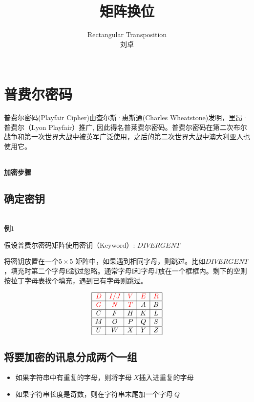 \documentclass{article}
\date{}
\title{矩阵换位}
\author{
Rectangular Transposition\\
 刘卓\\
 \texttt{ } \\
}
\begin{document}
\maketitle

\section{普费尔密码}

普费尔密码(Playfair Cipher)由查尔斯·惠斯通(Charles Wheatstone)发明，里昂·普费尔（Lyon Playfair）推广, 因此得名普莱费尔密码。普费尔密码在第二次布尔战争和第一次世界大战中被英军广泛使用，之后的第二次世界大战中澳大利亚人也使用它。

~\\

\textbf{加密步骤}

\subsection{确定密钥}

~\\

\textbf{例1}

假设普费尔密码矩阵使用密钥（Keyword）: $DIVERGENT$

将密钥放置在一个$5 \times 5$ 矩阵中，如果遇到相同字母，则跳过。比如$DIVERGENT$，填充时第二个字母{\color{red}E}跳过忽略。通常字母{\color{red}I}和字母{\color{red}J}放在一个框框内。剩下的空则按拉丁字母表挨个填充，遇到已有字母则跳过。

$$
\begin{array}{|c|c|c|c|c|}
\hline {\color{red}D} &  {\color{red}I / J} &  {\color{red}V} &  {\color{red}E} &  {\color{red}R} \\
\hline  {\color{red}G} &  {\color{red}N} &  {\color{red}T} & A & B \\
\hline C & F & H & K & L \\
\hline M & O & P & Q & S \\
\hline U & W & X & Y & Z \\
\hline
\end{array}
$$ 

\subsection{将要加密的讯息分成两个一组}

\begin{itemize}
\item 如果字符串中有重复的字母，则将字母$\ X $插入进重复的字母
\item 如果字符串长度是奇数，则在字符串末尾加一个字母$\ Q $
\end{itemize}
\end{document}
